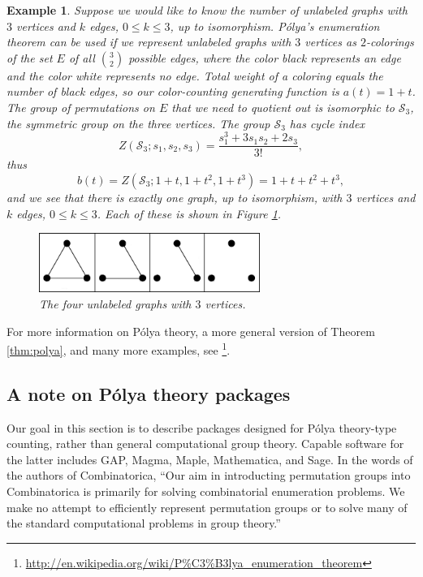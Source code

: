 \documentclass[12pt]{article}
\theoremstyle{plain}
\newtheorem{exa}{Example}
\begin{document}
\begin{exa}
\label{exa:graphs}
 Suppose we would like to know the number of unlabeled graphs with \( 3 \) vertices and \( k \) edges, \( 0 \leq k \leq 3 \), up to isomorphism.
 P\'olya's enumeration theorem can be used if we represent unlabeled graphs with \( 3 \) vertices as \(2\)-colorings of the set \( E \) of all \( \binom{3}{2} \) possible edges, where the color black represents an edge and the color white represents no edge.
 Total weight of a coloring equals the number of black edges, so our color-counting generating function is \(a(t) = 1+t \).
 The group of permutations on \( E \) that we need to quotient out is isomorphic to \(\mathcal{S}_3\), the symmetric group on the three vertices.
 The group \( \mathcal{S}_3 \) has cycle index
\[ Z( \mathcal{S}_3; s_1, s_2, s_3) = \frac{s_1^3 + 3 s_1 s_2 + 2 s_3}{3!}, \]
thus
\[ b(t) = Z( \mathcal{S}_3; 1+t, 1+t^2, 1+t^3)  = 1 + t + t^2 + t^3, \]
and we see that there is exactly one graph, up to isomorphism, with \( 3 \) vertices and \( k \) edges, \( 0 \leq k \leq 3 \).
Each of these is shown in Figure \ref{fig:graphs}.

\begin{figure}
\centering  \includegraphics[width=272px]{graphs}
\caption{The four unlabeled graphs with \( 3 \) vertices. \label{fig:graphs}}
\end{figure}

\end{exa}

For more information on P\'olya theory, a more general version of Theorem \ref{thm:polya}, and many more examples, see \cite{speciesbook,polya}\footnote{
 \url{http://en.wikipedia.org/wiki/P\%C3\%B3lya_enumeration_theorem}
}.

\subsection{A note on P\'olya theory packages}
Our goal in this section is to describe packages designed for P\'olya theory-type counting, rather than general computational group theory.
Capable software for the latter includes GAP, Magma, Maple, Mathematica, and Sage.
In the words of the authors of Combinatorica, ``Our aim in introducting permutation groups into Combinatorica is primarily for solving combinatorial enumeration problems.
We make no attempt to efficiently represent permutation groups or to solve many of the standard computational problems in group theory.'' \cite{skiena}
\end{document}
